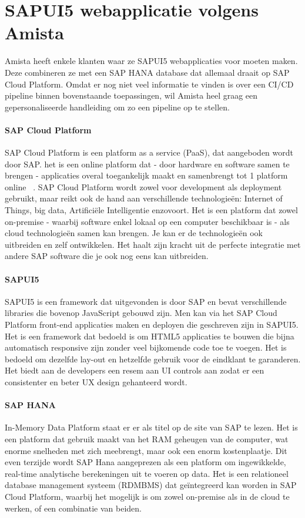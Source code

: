\section{SAPUI5 webapplicatie volgens Amista}
\label{sec:sapui5-sap-hana}
    Amista heeft enkele klanten waar ze SAPUI5 webapplicaties voor moeten maken. Deze combineren ze met een SAP HANA database dat allemaal draait op SAP Cloud Platform. Omdat er nog niet veel informatie te vinden is over een CI/CD pipeline binnen bovenstaande toepassingen, wil Amista heel graag een gepersonaliseerde handleiding om zo een pipeline op te stellen.
     
    \paragraph{SAP Cloud Platform}
        SAP Cloud Platform is een platform as a service (PaaS), dat aangeboden wordt door SAP. het is een online platform dat - door hardware en software samen te brengen - applicaties overal toegankelijk maakt en samenbrengt tot 1 platform online ~\autocite{SAPSE2018}.
        SAP Cloud Platform wordt zowel voor development als deployment gebruikt, maar reikt ook de hand aan verschillende technologieën: Internet of Things, big data, Artificiële Intelligentie enzovoort. Het is een platform dat zowel on-premise - waarbij software enkel lokaal op een computer beschikbaar is - als cloud technologieën samen kan brengen. Je kan er de technologieën ook uitbreiden en zelf ontwikkelen. Het haalt zijn kracht uit de perfecte integratie met andere SAP software die je ook nog eens kan uitbreiden.
    
    \paragraph{SAPUI5}
        SAPUI5 is een framework dat uitgevonden is door SAP en bevat verschillende libraries die bovenop JavaScript gebouwd zijn. Men kan via het SAP Cloud Platform front-end applicaties maken en deployen die geschreven zijn in SAPUI5. Het is een framework dat bedoeld is om HTML5 applicaties te bouwen die bijna automatisch responsive zijn zonder veel bijkomende code toe te voegen.
        Het is bedoeld om dezelfde lay-out en hetzelfde gebruik voor de eindklant te garanderen. Het biedt aan de developers een resem aan UI controls aan zodat er een consistenter en beter UX design gehanteerd wordt.~\autocite{SAPSEa} 
    
    \paragraph{SAP HANA}
        In-Memory Data Platform staat er er als titel op de site van SAP te lezen. Het is een platform dat gebruik maakt van het RAM geheugen van de computer, wat enorme snelheden met zich meebrengt, maar ook een enorm kostenplaatje. Dit even terzijde wordt SAP Hana aangeprezen als een platform  om ingewikkelde, real-time analytische berekeningen uit te voeren op data.
        Het is een relationeel database management systeem (RDMBMS) dat geïntegreerd kan worden in SAP Cloud Platform, waarbij het mogelijk is om zowel on-premise als in de cloud te werken, of een combinatie van beiden. 


